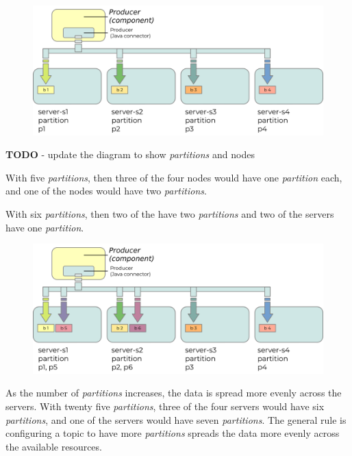 \documentclass{article}
\newcommand{\kfpartition} {\textit{partition}\xspace}
\newcommand{\kfpartitions} {\textit{partitions}\xspace}
\newcommand{\javaname}[1] {{\ttfamily\color{codeblue} #1}}
\begin{document}
\begin{figure}[H]
\begin{center}
\includegraphics{images/kafka-partitions-06.png}
%
\label{fig:kafka-partitions-06}
\end{center}
\end{figure}

\textbf{TODO} - update the diagram to show \kfpartitions and nodes

With five \kfpartitions, then three of the four nodes would have one \kfpartition each, and one of the nodes would have two \kfpartitions.

With six \kfpartitions, then two of the have two \kfpartitions and two of the servers have one \kfpartition.

\begin{figure}[H]
\begin{center}
\includegraphics{images/kafka-partitions-08.png}
%
\label{fig:kafka-partitions-07}
\end{center}
\end{figure}

As the number of \kfpartitions increases, the data is spread more evenly across the servers.
With twenty five \kfpartitions, three of the four servers would have six
\kfpartitions, and one of the servers would have seven \kfpartitions.
The general rule is configuring a topic to have more \kfpartitions spreads the data more evenly across the available resources.
\end{document}
